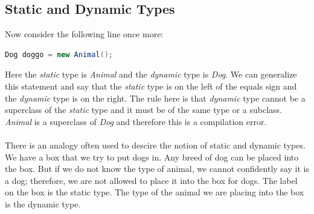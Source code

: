 \documentclass{article}
\begin{document}
\subsection{Static and Dynamic Types}
Now consider the following line once more:
\begin{lstlisting}[language=Java]
    Dog doggo = new Animal();
\end{lstlisting}
Here the \textit{static} type is \textit{Animal} and the \textit{dynamic} type is \textit{Dog}. We can generalize this statement and say that the \textit{static} type is on the left of the equals sign and the \textit{dynamic} type is on the right. The rule here is that \textit{dynamic} type cannot be a superclass of the \textit{static} type and it must be of the same type or a subclass. \textit{Animal} is a superclass of \textit{Dog} and therefore this is a compilation error. \\ \\
There is an analogy often used to descire the notion of static and dynamic types. We have a box that we try to put dogs in. Any breed of dog can be placed into the box. But if we do not know the type of animal, we cannot confidently say it is a dog; therefore, we are not allowed to place it into the box for dogs. The label on the box is the static type. The type of the animal we are placing into the box is the dynamic type.

%
%
%
\end{document}
